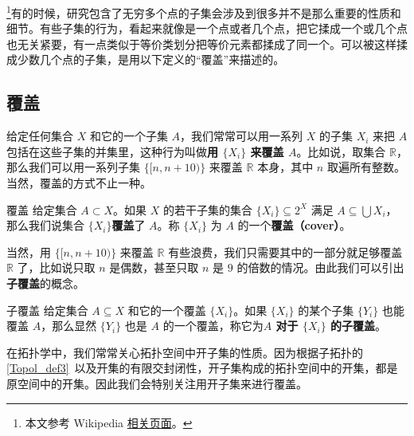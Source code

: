 


\begin{issues}
\issueDraft
\end{issues}

\footnote{本文参考 Wikipedia \href{https://en.wikipedia.org/wiki/Sequentially_compact_space}{相关页面}。}有的时候，研究包含了无穷多个点的子集会涉及到很多并不是那么重要的性质和细节。有些子集的行为，看起来就像是一个点或者几个点，把它揉成一个或几个点也无关紧要，有一点类似于等价类划分把等价元素都揉成了同一个。可以被这样揉成少数几个点的子集，是用以下定义的“覆盖”来描述的。


\subsection{覆盖}

给定任何集合 $X$ 和它的一个子集 $A$，我们常常可以用一系列 $X$ 的子集 $X_i$ 来把 $A$ 包括在这些子集的并集里，这种行为叫做\textbf{用 $\{X_i\}$ 来覆盖 $A$}。比如说，取集合 $\mathbb{R}$，那么我们可以用一系列子集 $\{[n, n+10)\}$ 来覆盖 $\mathbb{R}$ 本身，其中 $n$ 取遍所有整数。当然，覆盖的方式不止一种。

\begin{definition}{覆盖}
给定集合 $A\subset X$。如果 $X$ 的若干子集的集合 $\{X_i\}\subseteq 2^X$ 满足 $A\subseteq\bigcup X_i$，那么我们说集合 $\{X_i\}$\textbf{覆盖}了 $A$。称 $\{X_i\}$ 为 $A$ 的一个\textbf{覆盖（cover）}。
\end{definition}

当然，用 $\{[n, n+10)\}$ 来覆盖 $\mathbb{R}$ 有些浪费，我们只需要其中的一部分就足够覆盖 $\mathbb{R}$ 了，比如说只取 $n$ 是偶数，甚至只取 $n$ 是 $9$ 的倍数的情况。由此我们可以引出\textbf{子覆盖}的概念。

\begin{definition}{子覆盖}
给定集合 $A\subseteq X$ 和它的一个覆盖 $\{X_i\}$。如果 $\{X_i\}$ 的某个子集 $\{Y_i\}$ 也能覆盖 $A$，那么显然 $\{Y_i\}$ 也是 $A$ 的一个覆盖，称它为\textbf{$A$ 对于 $\{X_i\}$ 的子覆盖}。
\end{definition}

在拓扑学中，我们常常关心拓扑空间中开子集的性质。因为根据子拓扑的\autoref{Topol_def3}~以及开集的有限交封闭性，开子集构成的拓扑空间中的开集，都是原空间中的开集。因此我们会特别关注用开子集来进行覆盖。

